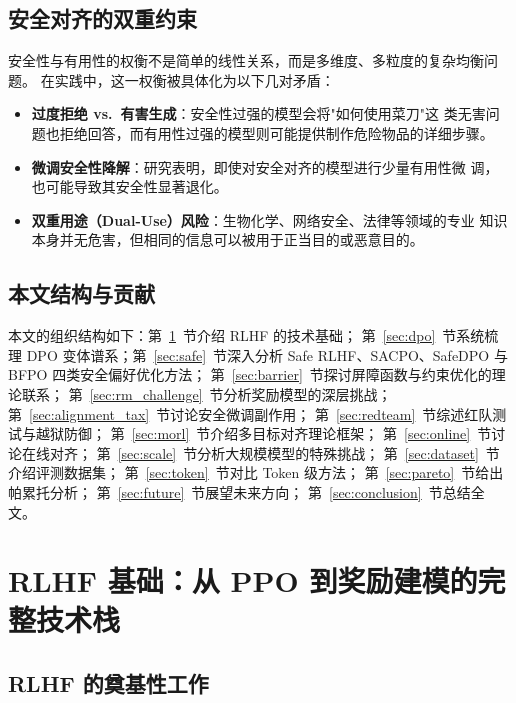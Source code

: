 \documentclass[12pt,a4paper,UTF8]{ctexart}
\begin{document}
\subsection{安全对齐的双重约束}

安全性与有用性的权衡不是简单的线性关系，而是多维度、多粒度的复杂均衡问题。
在实践中，这一权衡被具体化为以下几对矛盾：

\begin{itemize}[leftmargin=2em]
  \item \textbf{过度拒绝 vs.\ 有害生成}：安全性过强的模型会将"如何使用菜刀"这
    类无害问题也拒绝回答，而有用性过强的模型则可能提供制作危险物品的详细步骤。
  \item \textbf{微调安全性降解}：研究表明，即使对安全对齐的模型进行少量有用性微
    调，也可能导致其安全性显著退化。
  \item \textbf{双重用途（Dual-Use）风险}：生物化学、网络安全、法律等领域的专业
    知识本身并无危害，但相同的信息可以被用于正当目的或恶意目的。
\end{itemize}

\subsection{本文结构与贡献}

本文的组织结构如下：第~\ref{sec:rlhf}~节介绍 RLHF 的技术基础；
第~\ref{sec:dpo}~节系统梳理 DPO 变体谱系；第~\ref{sec:safe}~节深入分析
Safe RLHF、SACPO、SafeDPO 与 BFPO 四类安全偏好优化方法；
第~\ref{sec:barrier}~节探讨屏障函数与约束优化的理论联系；
第~\ref{sec:rm_challenge}~节分析奖励模型的深层挑战；
第~\ref{sec:alignment_tax}~节讨论安全微调副作用；
第~\ref{sec:redteam}~节综述红队测试与越狱防御；
第~\ref{sec:morl}~节介绍多目标对齐理论框架；
第~\ref{sec:online}~节讨论在线对齐；
第~\ref{sec:scale}~节分析大规模模型的特殊挑战；
第~\ref{sec:dataset}~节介绍评测数据集；
第~\ref{sec:token}~节对比 Token 级方法；
第~\ref{sec:pareto}~节给出帕累托分析；
第~\ref{sec:future}~节展望未来方向；
第~\ref{sec:conclusion}~节总结全文。

\section{RLHF 基础：从 PPO 到奖励建模的完整技术栈}
\label{sec:rlhf}

\subsection{RLHF 的奠基性工作}
\end{document}
